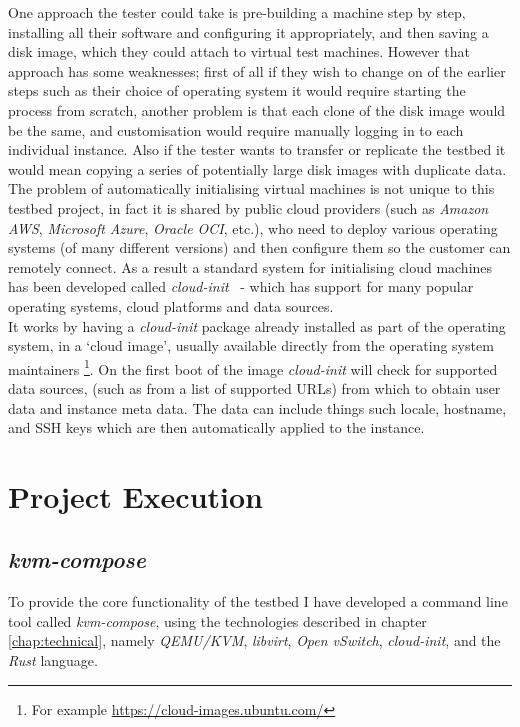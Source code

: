 \documentclass[
    author={Jacob Daniel Halsey},
    supervisor={Prof. Awais Rashid},
    degree={BSc},
    title={Building a Testbed for Evaluating Privacy Enhancing Technologies  (PETs)},
    subtitle={},
    type={software development},
    year={2021}
]{dissertation}
\begin{document}
One approach the tester could take is pre-building a machine step by step,
installing all their software and configuring it appropriately, and then saving
a disk image, which they could attach to virtual test machines. However that approach 
has some weaknesses; first of all if they wish to change on of the earlier steps
such as their choice of operating system it would require starting the process from scratch,
another problem is that each clone of the disk image would be the same, and customisation
would require manually logging in to each individual instance.
Also if the tester wants to transfer or replicate the testbed it would mean copying
a series of potentially large disk images with duplicate data. \\

The problem of automatically initialising virtual machines is not unique to this testbed project,
in fact it is shared by public cloud providers (such as \emph{Amazon AWS}, \emph{Microsoft Azure},
\emph{Oracle OCI}, etc.), who need to deploy various operating systems (of many different versions)
and then configure them so the customer can remotely connect.
As a result a standard system for initialising cloud machines has
been developed called \emph{cloud-init}~\cite{cloud_init} - which has support for many popular operating systems,
cloud platforms and data sources. \\

It works by having a \emph{cloud-init} package already installed as part of the operating system,
in a `cloud image', usually available directly from the operating system maintainers
\footnote{For example \url{https://cloud-images.ubuntu.com/}}.
On the first boot of the image \emph{cloud-init} will check for supported data sources,
(such as from a list of supported URLs) from which to obtain user data and instance meta data.
The data can include things such locale, hostname, and SSH keys which are then automatically
applied to the instance.

\chapter{Project Execution}
\label{chap:execution}

\section{\emph{kvm-compose}}

To provide the core functionality of the testbed I have developed a command line tool called \emph{kvm-compose},
using the technologies described in chapter \ref{chap:technical}, namely \emph{QEMU/KVM}, 
\emph{libvirt}, \emph{Open vSwitch}, \emph{cloud-init}, and the \emph{Rust} language.
\end{document}
